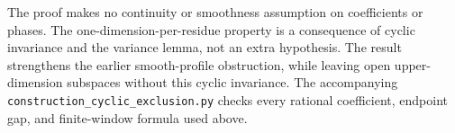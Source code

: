 \documentclass[11pt]{article}
\begin{document}
The proof makes no continuity or smoothness assumption on coefficients or
phases. The one-dimension-per-residue property is a consequence of cyclic
invariance and the variance lemma, not an extra hypothesis. The result
strengthens the earlier smooth-profile obstruction, while leaving open
upper-dimension subspaces without this cyclic invariance.
The accompanying \texttt{construction\_cyclic\_exclusion.py} checks every
rational coefficient, endpoint gap, and finite-window formula used above.
\end{document}
